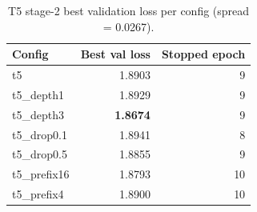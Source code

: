 \begin{table}[ht]
\centering
\caption{T5 stage-2 best validation loss per config (spread = 0.0267).}
\label{tab:s2_valloss_t5}
\footnotesize
\begin{tabular}{lrr}
\toprule
Config & Best val loss & Stopped epoch \\
\midrule
t5 & 1.8903 & 9 \\
t5\_depth1 & 1.8929 & 9 \\
t5\_depth3 & \textbf{1.8674} & 9 \\
t5\_drop0.1 & 1.8941 & 8 \\
t5\_drop0.5 & 1.8855 & 9 \\
t5\_prefix16 & 1.8793 & 10 \\
t5\_prefix4 & 1.8900 & 10 \\
\bottomrule
\end{tabular}
\end{table}
